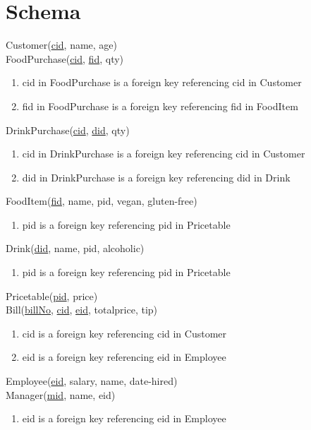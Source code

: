 \documentclass[dvips,12pt]{article}
\begin{document}
\section{Schema}
\noindent
Customer(\underline{cid}, name, age) \\
\noindent
FoodPurchase(\underline{cid}, \underline{fid}, qty) \\ \begin{enumerate}
\item cid in FoodPurchase is a foreign key referencing cid in Customer
\item fid in FoodPurchase is a foreign key referencing fid in FoodItem
\end{enumerate}
\noindent
DrinkPurchase(\underline{cid}, \underline{did}, qty) \\ \begin{enumerate}
\item cid in DrinkPurchase is a foreign key referencing cid in Customer
\item did in DrinkPurchase is a foreign key referencing did in Drink
\end{enumerate}
\noindent
FoodItem(\underline{fid}, name, pid, vegan, gluten-free) \\ \begin{enumerate}
\item pid is a foreign key referencing pid in Pricetable \end{enumerate}
\noindent
Drink(\underline{did}, name, pid, alcoholic) \begin{enumerate}
\item pid is a foreign key referencing pid in Pricetable \end{enumerate}
\noindent
Pricetable(\underline{pid}, price) \\

\noindent
Bill(\underline{billNo}, \underline{cid}, \underline{eid}, totalprice, tip) \\  \begin{enumerate}
\item cid is a foreign key referencing cid in Customer
\item eid is a foreign key referencing eid in Employee 
\end{enumerate} 
\noindent
Employee(\underline{eid}, salary, name, date-hired) \\


\noindent
Manager(\underline{mid}, name, eid) \\ \begin{enumerate}
\item eid is a foreign key referencing eid in Employee
\end{enumerate} 
\end{document}
